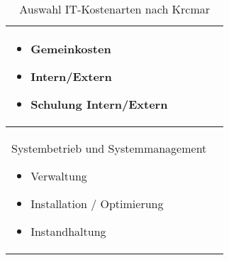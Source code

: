 \begin{table}[h!]
\begin{tabularx}{\textwidth}{|X|X|}
\begin{itemize}
				\item Gemeinkosten
				\item Intern/Extern
				\item Schulung Intern/Extern
			\end{itemize} & \\
		\hline Systembetrieb und Systemmanagement
			\begin{itemize}
				\item Verwaltung
				\item Installation / Optimierung
				\item Instandhaltung
			\end{itemize} & \\
		\hline
	\end{tabularx}
	\caption{Auswahl IT-Kostenarten nach Krcmar}
	\label{tab_auswahl_IT_kostenarten}
\end{table}

